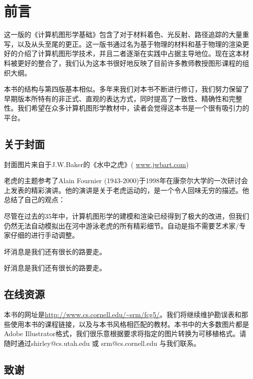 

\chapter*{前言}

这一版的《计算机图形学基础》包含了对于材料着色、光反射、路径追踪的大量重写，以及从头至尾的更正。这一版书通过名为基于物理的材料和基于物理的渲染更好的介绍了计算机图形学技术，并且二者逐渐在实践中占据主导地位。现在这本材料被更好的整合了，我们认为这本书很好地反映了目前许多教师教授图形课程的组织大纲。

本书的结构与第四版基本相似。多年来我们对本书不断进行修订，我们努力保留了早期版本所特有的非正式、直观的表达方式，同时提高了一致性、精确性和完整性。我们希望在众多计算机图形学教材中，读者会觉得这本书是一个很有吸引力的平台。

\section*{关于封面}

封面图片来自于J.W.Baker的《水中之虎》( \url{www.jwbart.com})

老虎的主题参考了Alain Fournier (1943-2000)于1998年在康奈尔大学的一次研讨会上发表的精彩演讲。他的演讲是关于老虎运动的，是一个令人回味无穷的描述。他总结了自己的观点：

尽管在过去的35年中，计算机图形学的建模和渲染已经得到了极大的改进，但我们仍然无法自动模拟出在河中游泳老虎的所有精彩细节。自动是指不需要艺术家/专家仔细的进行手动调整。

坏消息是我们还有很长的路要走。

好消息是我们还有很长的路要走。

\section*{在线资源}

本书的网址是\url{http://www.cs.cornell.edu/~srm/fcg5/}。我们将继续维护勘误表和那些使用本书的课程链接，以及与本书风格相匹配的教材。本书中的大多数图片都是Adobe Illustrator格式，我们很乐意根据要求将指定的图片转换为可移植格式。请随时通过shirley@cs.utah.edu 或 srm@cs.cornell.edu 与我们联系。

\section*{致谢}

